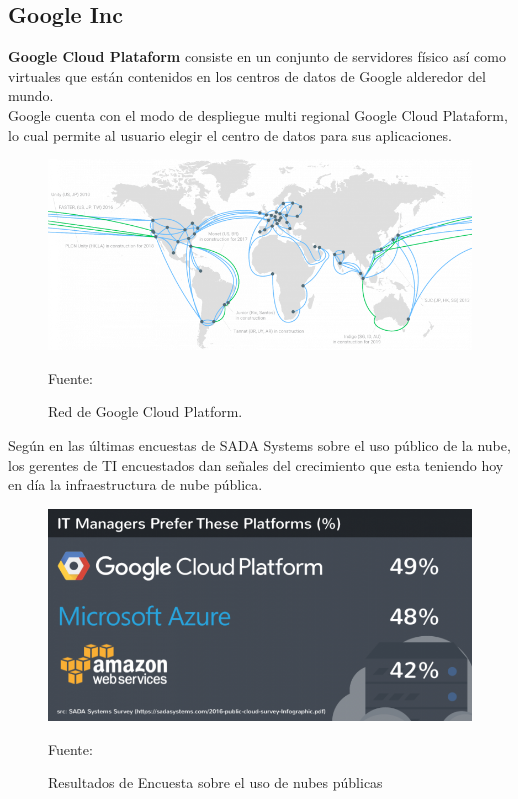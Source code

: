 \documentclass[a4paper, 12pt]{report}
\begin{document}
\subsection{Google Inc}
\begin{justify}
{\bf Google Cloud Plataform} consiste en un conjunto de servidores f\'isico as\'i como virtuales que est\'an contenidos en los centros de datos de Google alderedor del mundo.
\\ Google cuenta con el modo de despliegue  multi regional Google Cloud Plataform, lo cual permite al usuario elegir el centro de datos para sus aplicaciones.
\end{justify}
\begin{figure}[ht]
\begin{center}
\includegraphics[scale=0.6]{google_cloud}
\end{center}
\begin{center}
\vskip -0.5cm
\caption{\small{Red de Google Cloud Platform.}}
{\small{Fuente: \cite{google_cloud}}}
\end{center}
\end{figure}
\begin{justify}
Según \cite{google_cloud} en las \'ultimas encuestas de SADA Systems sobre el uso p\'ublico de la nube, los  gerentes de TI encuestados dan se\~{n}ales del crecimiento que esta teniendo hoy en día la infraestructura de nube p\'ublica.
\end{justify}
\begin{figure}[ht]
\begin{center}
\includegraphics[scale=0.4]{encuesta}
\end{center}
\begin{center}
\vskip -0.5cm
\caption{\small{Resultados de Encuesta sobre el uso de nubes p\'ublicas}}
{\small{Fuente: \cite{google_cloud}}}
\end{center}
\end{figure}
\end{document}

